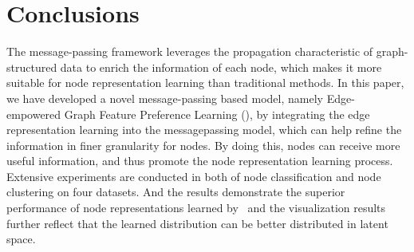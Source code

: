 \section{Conclusions}
\label{sec:Conclude}




The message-passing framework leverages the propagation characteristic of graph-structured data to enrich the information of each node, which makes it more suitable for node representation learning than traditional methods. 
%
In this paper, we have developed a novel message-passing based model, namely Edge-empowered Graph Feature Preference Learning (\alg), by integrating the edge representation learning into the messagepassing model, which can help refine the information in finer granularity for nodes. 
%
By doing this, nodes can receive more useful information, and thus promote the node representation learning process. 
Extensive experiments are conducted in both of node classification and node clustering on four datasets. 
%
And the results demonstrate the superior performance of node representations learned by \alg\, and the visualization results further reflect that the learned distribution can be better distributed in latent space. 
%


